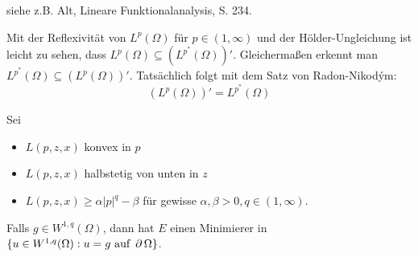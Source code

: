 	siehe z.B. Alt, \glqq Lineare Funktionalanalysis\grqq, S. 234.
	
\begin{bem} \label{bem_81}
	Mit der Reflexivität von $L^p(\Omega)$ für $p \in (1,\infty)$  und der Hölder-Ungleichung ist leicht zu sehen, dass $L^p(\Omega) \subseteq (L^{p^*}(\Omega))'$. Gleichermaßen erkennt man $L^{p^*}(\Omega) \subseteq (L^p(\Omega))'$. Tatsächlich folgt mit dem Satz von Radon-Nikodým:
	\[ (L^p(\Omega))' = L^{p^*}(\Omega) \]
\end{bem}
	
\begin{thm} \label{thm_82}
	Sei \marginnote{[82]} \begin{itemize}
	\item $L(p,z,x)$ konvex in $p$
	\item $L(p,z,x)$ halbstetig von unten in $z$
	\item $L(p,z,x) \geq \alpha |p|^q - \beta$ für gewisse $\alpha, \beta > 0, q \in (1,\infty)$.
	\end{itemize}
	Falls $g \in W^{1,q}(\Omega)$, dann hat $E$ einen Minimierer in $\{u \in W^{1,q}(\Omega) : u = g \text{ auf } \operatorname{\partial} \Omega \}$.
\end{thm}
	
